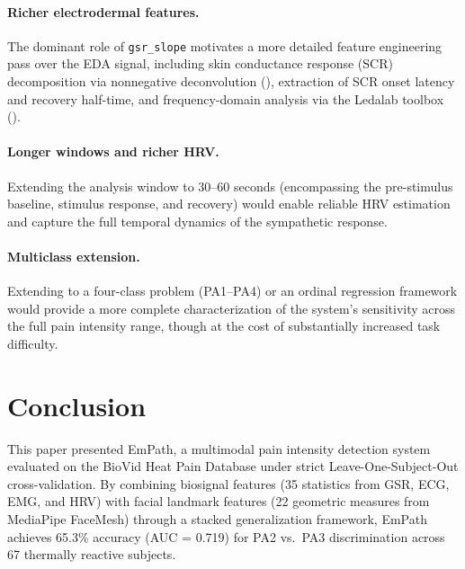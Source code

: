 \documentclass[10pt, twocolumn]{article}
\begin{document}
\paragraph{Richer electrodermal features.}
The dominant role of \texttt{gsr\_slope} motivates a more detailed feature engineering pass
over the EDA signal, including skin conductance response (SCR) decomposition via nonnegative
deconvolution (\cite{Greco2016}), extraction of SCR onset latency and recovery half-time,
and frequency-domain analysis via the Ledalab toolbox (\cite{Benedek2010}).

\paragraph{Longer windows and richer HRV.}
Extending the analysis window to 30--60 seconds (encompassing the pre-stimulus baseline,
stimulus response, and recovery) would enable reliable HRV estimation and capture the full
temporal dynamics of the sympathetic response.

\paragraph{Multiclass extension.}
Extending to a four-class problem (PA1--PA4) or an ordinal regression framework would
provide a more complete characterization of the system's sensitivity across the full pain
intensity range, though at the cost of substantially increased task difficulty.

\FloatBarrier
\section{Conclusion}
\label{sec:conclusion}

This paper presented EmPath, a multimodal pain intensity detection system evaluated on the
BioVid Heat Pain Database under strict Leave-One-Subject-Out cross-validation. By combining
biosignal features (35 statistics from GSR, ECG, EMG, and HRV) with facial landmark
features (22 geometric measures from MediaPipe FaceMesh) through a stacked generalization
framework, EmPath achieves 65.3\% accuracy (AUC = 0.719) for PA2 vs.\ PA3 discrimination
across 67 thermally reactive subjects.
\end{document}
